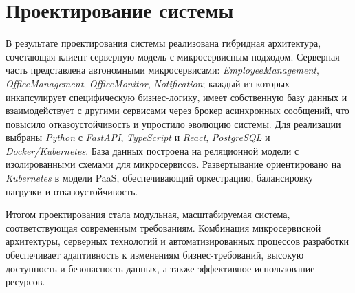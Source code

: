 \section{Проектирование системы}
\label{sec:system-design}












В результате проектирования системы реализована гибридная архитектура, сочетающая клиент-серверную модель с микросервисным подходом. Серверная часть представлена автономными микросервисами: \textit{Employee\-Ma\-na\-ge\-ment}, \textit{OfficeManagement}, \textit{OfficeMonitor}, \textit{Notification}; каждый из которых инкапсулирует специфическую бизнес-логику, имеет собственную базу данных и взаимодействует с другими сервисами через брокер асинхронных сообщений, что повысило отказоустойчивость и упростило эволюцию системы. Для реализации выбраны \textit{Python} с \textit{FastAPI}, \textit{TypeScript} и \textit{React}, \textit{PostgreSQL} и \textit{Docker/Kubernetes}. База данных построена на реляционной модели с изолированными схемами для микросервисов. Развертывание ориентировано на \textit{Kubernetes} в модели PaaS, обеспечивающий оркестрацию, балансировку нагрузки и отказоустойчивость. 

Итогом проектирования стала модульная, масштабируемая система, соответствующая современным требованиям. Комбинация микросервисной архитектуры, серверных технологий и автоматизированных процессов разработки обеспечивает адаптивность к изменениям бизнес-требований, высокую доступность и безопасность данных, а также эффективное использование ресурсов.

